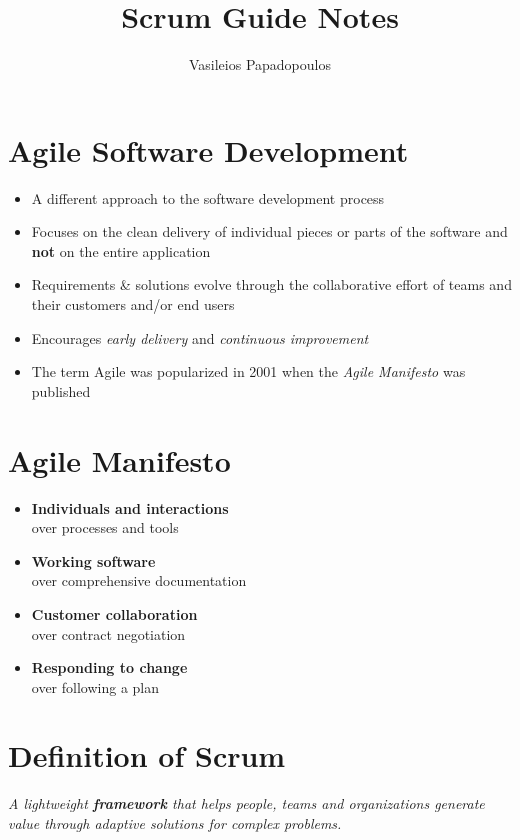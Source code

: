 \documentclass[a4paper,11pt,twocolumn]{article}
\title{\textbf{Scrum Guide Notes} \vspace{-2ex}}
\author{Vasileios Papadopoulos}
\date{}
\begin{document}
\maketitle

\thispagestyle{fancy}

\section*{Agile Software Development}
\begin{itemize}
	\item A different approach to the software development process
	\item Focuses on the clean delivery of individual pieces or parts of the software and \textbf{not} on the entire application
	\item Requirements \& solutions evolve through the collaborative effort of teams and their customers and/or end users
	\item Encourages \textit{early delivery} and \textit{continuous improvement}
	\item The term Agile was popularized in 2001 when the \textit{Agile Manifesto} was published
\end{itemize}

\section*{Agile Manifesto}
\begin{itemize}
	\item \textbf{Individuals and interactions}\\
	      over processes and tools
	\item \textbf{Working software}\\
	      over comprehensive documentation
	\item \textbf{Customer collaboration}\\
	      over contract negotiation
	\item \textbf{Responding to change}\\
	      over following a plan
\end{itemize}

\section*{Definition of Scrum}
\textit{A lightweight \textbf{framework} that helps people, teams and organizations generate value through adaptive solutions for complex problems.}
\end{document}
